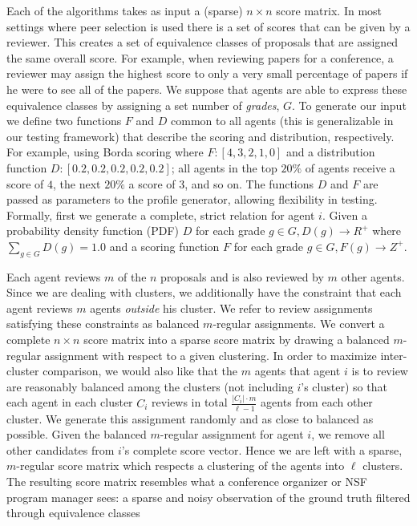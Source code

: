 \documentclass[letterpaper]{article}
\begin{document}
Each of the algorithms takes as input a (sparse) $n \times n$ score matrix.
In most settings where peer selection is used there is a set of scores that can be given by a reviewer. This creates a set of equivalence classes of proposals that are assigned the same overall score. For example, when reviewing papers for a conference, a reviewer may assign the highest score to only a very small percentage of papers if he were to see all of the papers. We suppose that agents are able to express these equivalence classes by assigning a set number of \emph{grades}, $G$. %
To generate our input we define two functions $F$ and $D$ common to all agents (this is generalizable in our testing framework) that describe the scoring and distribution, respectively. For example, using Borda scoring where $F:[4, 3, 2, 1, 0]$ and a distribution function $D: [0.2, 0.2, 0.2, 0.2, 0.2]$; all agents in the top $20\%$ of agents receive a score of $4$, the next $20\%$ a score of $3$, and so on. The functions $D$ and $F$ are passed as parameters to the profile generator, allowing flexibility in testing.
Formally, first we generate a complete, strict relation for agent $i$. Given a probability density function (PDF) $D$ for each grade $g\in G, D(g) \rightarrow R^+$ where $\sum_{g \in G} D(g) = 1.0$ and a scoring function $F$ for each grade $g \in G, F(g) \rightarrow Z^+$.

Each agent reviews $m$ of the $n$ proposals and is also reviewed by $m$ other agents. Since we are dealing with clusters, we additionally have the constraint that each agent reviews $m$ agents \emph{outside} his cluster. We refer to review assignments satisfying these constraints as balanced $m$-regular assignments.
We convert a complete $n \times n$ score matrix into a sparse score matrix by drawing a balanced $m$-regular assignment with respect to a given clustering. In order to maximize inter-cluster comparison, we would also like that the $m$ agents that agent $i$ is to review are reasonably balanced among the clusters (not including $i$'s cluster) so that each agent in each cluster $C_i$ reviews in total $\frac{|C_i| \cdot m}{\ell -1}$ agents from each other cluster. We generate this assignment randomly and as close to balanced as possible.
Given the balanced $m$-regular assignment for agent $i$, we remove all other candidates from $i$'s complete score vector. Hence we are left with a sparse, $m$-regular score matrix which respects a clustering of the agents into $\ell$ clusters. The resulting score matrix resembles what a conference organizer or NSF program manager sees: a sparse and noisy observation of the ground truth filtered through equivalence classes
\end{document}
